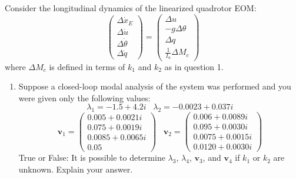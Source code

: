 \begin{question}
    Consider the longitudinal dynamics of the linearized quadrotor EOM:
    \begin{equation*}
        \left(\begin{array}{c}
        \Delta \dot{x}_E \\
        \Delta \dot{u} \\
        \Delta \dot{\theta} \\
        \Delta \dot{q}
        \end{array}\right)=\left(\begin{array}{c}
        \Delta u \\
        -g \Delta \theta \\
        \Delta q \\
        \frac{1}{I_u} \Delta M_c
        \end{array}\right)
    \end{equation*}
    where $\Delta M_c$ is defined in terms of $k_1$ and $k_2$ as in question 1. 

    \begin{enumerate}
        \item Suppose a closed-loop modal analysis of the system was performed and you were given only the following values:
    \begin{equation*}
        \lambda_1 = -1.5+4.2i \hspace{10pt} \lambda_2 = -0.0023+0.037i
    \end{equation*}
    \begin{equation*}
        \mathbf{v}_1 =  \left(\begin{array}{c}
        0.005+0.0021i \\
        0.075+0.0019i \\
        0.0085+0.0065i \\
        0.05 %
        \end{array}\right) 
        \hspace{10pt} \mathbf{v}_2 = \left(\begin{array}{c}
        0.006+0.0089i \\
        0.095+0.0030i \\
        0.0075+0.0015i \\
        0.0120+0.0030i %
        \end{array}\right) 
    \end{equation*}
    True or False: It is possible to determine $\lambda_3$, $\lambda_4$, $\mathbf{v}_3$, and $\mathbf{v}_4$ if $k_1$ or $k_2$ are unknown. Explain your answer.
    

\end{enumerate}
\end{question}
